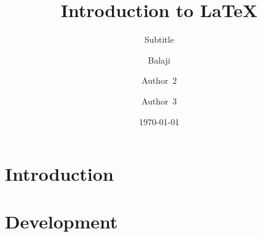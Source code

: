 \documentclass{beamer}
\begin{document}
    \begin{frame}
        \title{Introduction to \LaTeX{}}
        \author{Balaji \and 
        Author~2 \and
        Author~3}
        \date{\today}
        \subtitle{Subtitle}
        \maketitle
    \end{frame}
    \section{Introduction}
    \section{Development}
\end{document}
